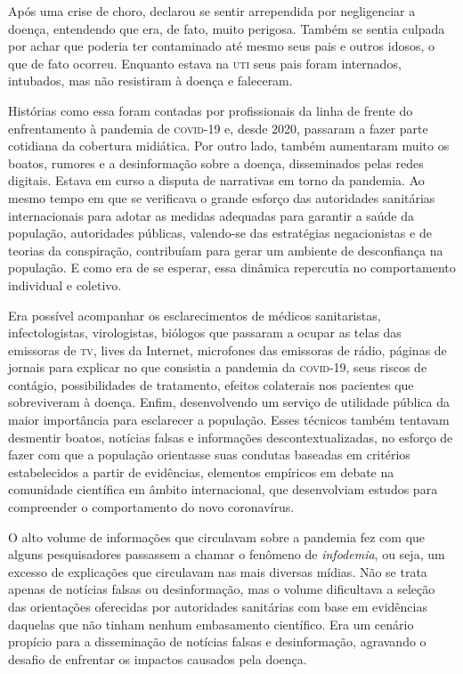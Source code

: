 Após uma crise de choro, declarou se sentir arrependida por negligenciar
a doença, entendendo que era, de fato, muito perigosa. Também se sentia
culpada por achar que poderia ter contaminado até mesmo seus pais e
outros idosos, o que de fato ocorreu. Enquanto estava na \textsc{uti} seus pais
foram internados, intubados, mas não resistiram à doença e faleceram.

Histórias como essa foram contadas por profissionais da linha de frente
do enfrentamento à pandemia de \textsc{covid-19} e, desde 2020, passaram a fazer
parte cotidiana da cobertura midiática. Por outro lado, também
aumentaram muito os boatos, rumores e a desinformação sobre a doença,
disseminados pelas redes digitais. Estava em curso a disputa de
narrativas em torno da pandemia. Ao mesmo tempo em que se verificava o
grande esforço das autoridades sanitárias internacionais para adotar as
medidas adequadas para garantir a saúde da população, autoridades
públicas, valendo-se das estratégias negacionistas e de teorias da
conspiração, contribuíam para gerar um ambiente de desconfiança na
população. E como era de se esperar, essa dinâmica repercutia no
comportamento individual e coletivo.

Era possível acompanhar os esclarecimentos de médicos sanitaristas,
infectologistas, virologistas, biólogos que passaram a ocupar as telas
das emissoras de \textsc{tv}, lives da Internet, microfones das emissoras de
rádio, páginas de jornais para explicar no que consistia a pandemia da
\textsc{covid-19}, seus riscos de contágio, possibilidades de tratamento, efeitos
colaterais nos pacientes que sobreviveram à doença. Enfim, desenvolvendo
um serviço de utilidade pública da maior importância para esclarecer a
população. Esses técnicos também tentavam desmentir boatos, notícias
falsas e informações descontextualizadas, no esforço de fazer com que a
população orientasse suas condutas baseadas em critérios estabelecidos a
partir de evidências, elementos empíricos em debate na comunidade
científica em âmbito internacional, que desenvolviam estudos para
compreender o comportamento do novo coronavírus.

O alto volume de informações que circulavam sobre a pandemia fez com que
alguns pesquisadores passassem a chamar o fenômeno de \textit{infodemia}, ou
seja, um excesso de explicações que circulavam nas mais diversas mídias.
Não se trata apenas de notícias falsas ou desinformação, mas o volume
dificultava a seleção das orientações oferecidas por autoridades
sanitárias com base em evidências daquelas que não tinham nenhum
embasamento científico. Era um cenário propício para a disseminação de
notícias falsas e desinformação, agravando o desafio de enfrentar os
impactos causados pela doença.

